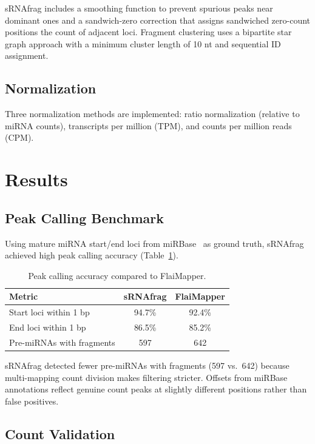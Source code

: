\documentclass[11pt]{article}
\begin{document}
sRNAfrag includes a smoothing function to prevent spurious peaks near dominant ones and a sandwich-zero correction that assigns sandwiched zero-count positions the count of adjacent loci.  Fragment clustering uses a bipartite star graph approach with a minimum cluster length of 10 nt and sequential ID assignment.

\subsection{Normalization}

Three normalization methods are implemented: ratio normalization (relative to miRNA counts), transcripts per million (TPM), and counts per million reads (CPM).

\section{Results}

\subsection{Peak Calling Benchmark}

Using mature miRNA start/end loci from miRBase~\citep{kozomara2019mirbase} as ground truth, sRNAfrag achieved high peak calling accuracy (Table~\ref{tab:peakcalling}).

\begin{table}[ht]
\centering
\caption{Peak calling accuracy compared to FlaiMapper.}
\label{tab:peakcalling}
\begin{tabular}{@{}lcc@{}}
\toprule
Metric & sRNAfrag & FlaiMapper \\
\midrule
Start loci within 1 bp & 94.7\% & 92.4\% \\
End loci within 1 bp & 86.5\% & 85.2\% \\
Pre-miRNAs with fragments & 597 & 642 \\
\bottomrule
\end{tabular}
\end{table}

sRNAfrag detected fewer pre-miRNAs with fragments (597 vs.\ 642) because multi-mapping count division makes filtering stricter.  Offsets from miRBase annotations reflect genuine count peaks at slightly different positions rather than false positives.

\subsection{Count Validation}
\end{document}
